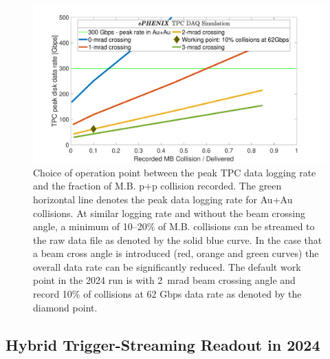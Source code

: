 \begin{figure}[htbp]
\begin{center}
\includegraphics[width=.8\linewidth]{figs/TPCRateLayeredPP_BUP2020_Summary_TriggerWindowRateCoverageCompile.pdf}
\caption{Choice of operation point between the peak TPC data logging rate and the fraction of M.B. p+p collision recorded. The green horizontal line denotes the peak data logging rate for Au+Au collisions. At similar logging rate and without the beam crossing angle, a minimum of 10--20\% of \pp M.B. collisions can be streamed to the raw data file as denoted by the solid blue curve. In the case that a beam cross angle is introduced (red, orange and green curves) the overall data rate can be significantly reduced. The default work point in the 2024 run is with 2~mrad beam crossing angle and record 10\% of collisions at 62 Gbps data rate as denoted by the diamond point.}
\label{fig:TPC-DAQ-rate}
\end{center}
\end{figure}

 
 
\subsection{Hybrid Trigger-Streaming Readout in 2024}
 

